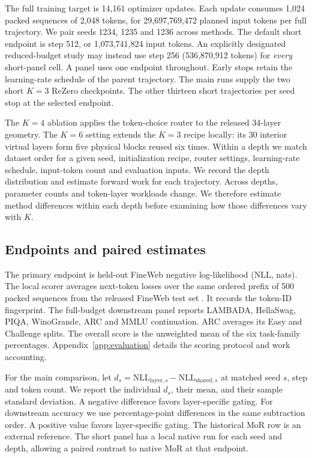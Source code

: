 \documentclass[11pt,letterpaper]{article}
\newcommand{\nll}{\mathrm{NLL}}
\begin{document}
The full training target is 14,161 optimizer updates. Each update consumes 1,024 packed sequences of 2,048 tokens, for 29,697,769,472 planned input tokens per full trajectory. We pair seeds 1234, 1235 and 1236 across methods. The default short endpoint is step 512, or 1,073,741,824 input tokens. An explicitly designated reduced-budget study may instead use step 256 (536,870,912 tokens) for \emph{every} short-panel cell. A panel uses one endpoint throughout. Early stops retain the learning-rate schedule of the parent trajectory. The main runs supply the two short \(K=3\) ReZero checkpoints. The other thirteen short trajectories per seed stop at the selected endpoint.

The \(K=4\) ablation applies the token-choice router to the released 34-layer geometry. The \(K=6\) setting extends the \(K=3\) recipe locally: its 30 interior virtual layers form five physical blocks reused six times. Within a depth we match dataset order for a given seed, initialization recipe, router settings, learning-rate schedule, input-token count and evaluation inputs. We record the depth distribution and estimate forward work for each trajectory. Across depths, parameter counts and token-layer workloads change. We therefore estimate method differences within each depth before examining how those differences vary with \(K\).

\subsection{Endpoints and paired estimates}
The primary endpoint is held-out FineWeb negative log-likelihood (NLL, nats). The local scorer averages next-token losses over the same ordered prefix of 500 packed sequences from the released FineWeb test set \citep{finewebtest}. It records the token-ID fingerprint. The full-budget downstream panel reports LAMBADA, HellaSwag, PIQA, WinoGrande, ARC and MMLU continuation. ARC averages its Easy and Challenge splits. The overall score is the unweighted mean of the six task-family percentages. Appendix~\ref{app:evaluation} details the scoring protocol and work accounting.

For the main comparison, let \(d_s=\nll_{\mathrm{layer},s}-\nll_{\mathrm{shared},s}\) at matched seed \(s\), step and token count. We report the individual \(d_s\), their mean, and their sample standard deviation. A negative difference favors layer-specific gating. For downstream accuracy we use percentage-point differences in the same subtraction order. A positive value favors layer-specific gating. The historical MoR row is an external reference. The short panel has a local native run for each seed and depth, allowing a paired contrast to native MoR at that endpoint.
\end{document}

